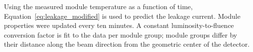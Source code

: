 Using the measured module temperature as a function of time, Equation~\ref{eq:leakage_modified} is used to predict the leakage current. 
Module properties were updated every ten minutes.    A constant luminosity-to-fluence conversion factor is fit to the data per module group;  module groups differ by their distance along the beam direction from the geometric center of the detector.  



